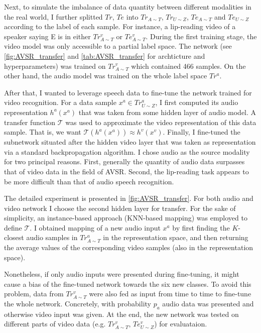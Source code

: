Next, to simulate the imbalance of data quantity between different
modalities in the real world, I further splitted $Tr$, $Te$ into
$Tr_{A\sim T}$, $Tr_{U\sim Z}$, $Te_{A\sim T}$ and $Te_{U\sim Z}$
according to the label of each sample.
For instance, a lip-reading video of a speaker saying E is in either
$Tr_{A\sim T}^v$ or $Te_{A\sim T}^v$.
During the first training stage, the video model was only accessible
to a partial label space. The network (see \autoref{fig:AVSR_transfer}
and \autoref{tab:AVSR_transfer} for archticture and hyperparameters)
was trained on $Tr_{A\sim T}^v$ which contained 466 samples.
On the other hand, the audio model was trained on the whole
label space $Tr^a$.

After that, I wanted to leverage speech data to fine-tune the network
trained for video recognition. For a data sample $x^a\in Tr_{U\sim Z}^a$,
I first computed its audio representation $h^a(x^a)$ that was taken from
some hidden layer of audio model. A transfer function $\mathcal{T}$ was used
to approximate the video representation of this data sample.
That is, we want $\mathcal{T}(h^a(x^a))\approx h^v(x^v)$. Finally, I
fine-tuned the subnetwork situated after the hidden video layer that
was taken as representation via a standard backpropagation algorithm.
I chose audio as the source modality for two principal reasons.
First, generally the quantity of audio data surpasses that of video
data in the field of AVSR. Second, the lip-reading task
appears to be more difficult than that of audio speech recognition.

The detailed experiment is presented in \autoref{fig:AVSR_transfer}.
For both audio and video network I choose the second hidden layer for
transfer. For the sake of simplicity, an instance-based approach
(KNN-based mapping) was employed to define $\mathcal{T}$.
I obtained mapping of a new audio
input $x^a$ by first finding the $K$-closest audio samples in
$Tr_{A\sim T}^a$ in the representation space, and then returning the
average values of the corresponding video samples
(also in the representation space).

Nonetheless, if only audio inputs were presented during fine-tuning, it
might cause a bias of the fine-tuned network towards the six new classes.
To avoid this problem, data from $Tr_{A\sim T}^v$ were also fed as input
from time to time to fine-tune the whole network. Concretely, with
probability $p_a$ audio data was presented and otherwise video input
was given. At the end, the new network was tested on different parts of
video data (e.g. $Tr_{A\sim T}^v$, $Te_{U\sim Z}^v$) for evaluataion.

